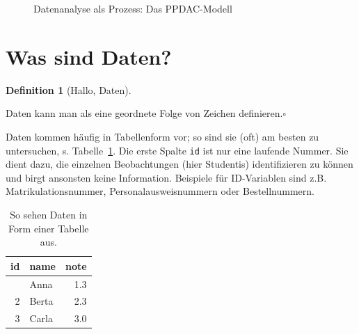 \documentclass[
  a4paper,
]{scrbook}
\theoremstyle{definition}
\theoremstyle{definition}
\newtheorem{definition}{Definition}[chapter]
\theoremstyle{definition}
\theoremstyle{remark}
\begin{document}
\begin{figure}


\caption{\label{fig-ppdac}Datenanalyse als Prozess: Das PPDAC-Modell}

\end{figure}%

\section{Was sind Daten?}\label{was-sind-daten}

\begin{definition}[Hallo,
Daten]\protect\hypertarget{def-daten}{}\label{def-daten}

Daten kann man als eine geordnete Folge von Zeichen
definieren.\(\square\)

\end{definition}

Daten kommen häufig in Tabellenform vor; so sind sie (oft) am besten zu
untersuchen, s. Tabelle~\ref{tbl-daten}. Die erste Spalte \texttt{id}
ist nur eine laufende Nummer. Sie dient dazu, die einzelnen
Beobachtungen (hier Studentis) identifizieren zu können und birgt
ansonsten keine Information. Beispiele für ID-Variablen sind z.B.
Matrikulationsnummer, Personalausweisnummern oder Bestellnummern.

\begin{longtable}{rlr}

\caption{\label{tbl-daten}So sehen Daten in Form einer Tabelle aus.}

\tabularnewline

\toprule
id & name & note \\ 
\midrule\addlinespace[2.5pt]
1 & Anna & 1.3 \\ 
2 & Berta & 2.3 \\ 
3 & Carla & 3.0 \\ 
\bottomrule

\end{longtable}
\end{document}
